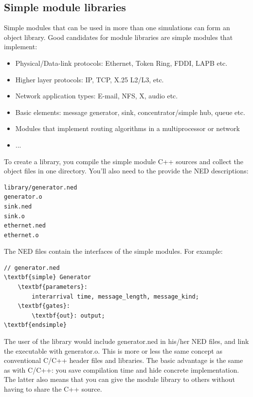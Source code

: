 \subsection{Simple module libraries}

Simple modules that can be used in more than one simulations can form an
object library. Good candidates for module
libraries are simple
modules that implement:
\begin{itemize}
\item{Physical/Data-link protocols: Ethernet, Token Ring, FDDI, LAPB
    etc.}
\item{Higher layer protocols: IP, TCP, X.25 L2/L3, etc.}
\item{Network application types: E-mail, NFS, X, audio etc.}
\item{Basic elements: message generator, sink, concentrator/simple
    hub, queue etc.}
\item{Modules that implement routing algorithms in a multiprocessor or
    network}
\item{...}
\end{itemize}

To create a library, you compile the simple module C++ sources
and collect the object files in one directory. You'll also need
to the provide the NED descriptions:


\begin{Verbatim}[commandchars=\\\{\}]
library/generator.ned
generator.o
sink.ned
sink.o
ethernet.ned
ethernet.o
\end{Verbatim}



The NED files contain the interfaces of the
simple modules. For example:


\begin{Verbatim}[commandchars=\\\{\}]
// generator.ned
\textbf{simple} Generator
    \textbf{parameters}:
        interarrival time, message_length, message_kind;
    \textbf{gates}:
        \textbf{out}: output;
\textbf{endsimple}
\end{Verbatim}


The user of the library would include generator.ned in his/her
NED files, and link the executable with generator.o. This is
more or less the same concept as conventional C/C++ header files
and libraries. The basic advantage is the same as with C/C++:
you save compilation time and hide concrete implementation. The
latter also means that you can give the module library to others
without having to share the C++ source.


